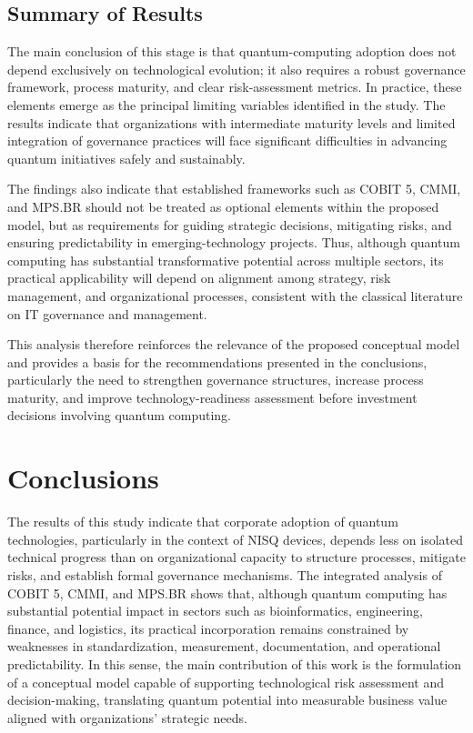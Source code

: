 \documentclass{icis}
\begin{document}
\subsection{Summary of Results}
The main conclusion of this stage is that quantum-computing adoption does not depend exclusively on technological evolution; it also requires a robust governance framework, process maturity, and clear risk-assessment metrics. In practice, these elements emerge as the principal limiting variables identified in the study. The results indicate that organizations with intermediate maturity levels and limited integration of governance practices will face significant difficulties in advancing quantum initiatives safely and sustainably.

The findings also indicate that established frameworks such as COBIT 5, CMMI, and MPS.BR should not be treated as optional elements within the proposed model, but as requirements for guiding strategic decisions, mitigating risks, and ensuring predictability in emerging-technology projects. Thus, although quantum computing has substantial transformative potential across multiple sectors, its practical applicability will depend on alignment among strategy, risk management, and organizational processes, consistent with the classical literature on IT governance and management.

This analysis therefore reinforces the relevance of the proposed conceptual model and provides a basis for the recommendations presented in the conclusions, particularly the need to strengthen governance structures, increase process maturity, and improve technology-readiness assessment before investment decisions involving quantum computing.

\section{Conclusions}
The results of this study indicate that corporate adoption of quantum technologies, particularly in the context of NISQ devices, depends less on isolated technical progress than on organizational capacity to structure processes, mitigate risks, and establish formal governance mechanisms. The integrated analysis of COBIT 5, CMMI, and MPS.BR shows that, although quantum computing has substantial potential impact in sectors such as bioinformatics, engineering, finance, and logistics, its practical incorporation remains constrained by weaknesses in standardization, measurement, documentation, and operational predictability. In this sense, the main contribution of this work is the formulation of a conceptual model capable of supporting technological risk assessment and decision-making, translating quantum potential into measurable business value aligned with organizations' strategic needs.
\end{document}
